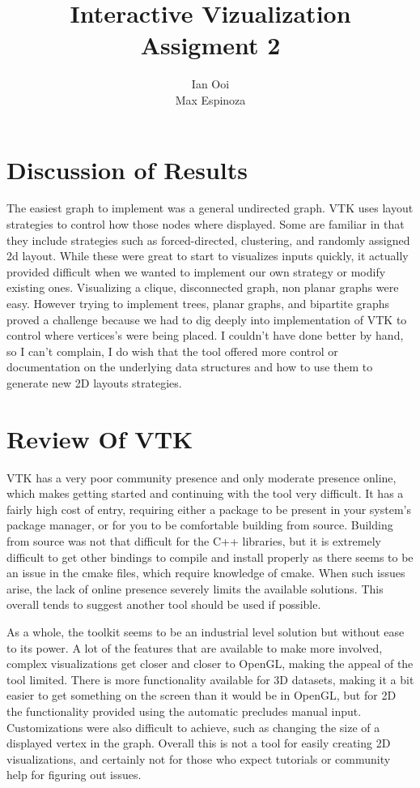 \documentclass[11pt]{article}
\title{\textbf{Interactive Vizualization}
\\
\normalsize{Assigment 2}
}
\author{Ian Ooi\\
		Max Espinoza}
\begin{document}
\maketitle


\section{Discussion of Results}

The easiest graph to implement was a general undirected graph. VTK uses layout strategies to control how those nodes where displayed. Some are familiar in that they include strategies such as forced-directed, clustering, and randomly assigned 2d layout. While these were great to start to visualizes inputs quickly, it actually provided difficult when we wanted to implement our own strategy or modify existing ones. Visualizing a clique, disconnected graph, non planar graphs were easy. However trying to implement trees, planar graphs, and bipartite graphs proved a challenge because we had to dig deeply into implementation of VTK to control where vertices's were being placed. I couldn't have done better by hand, so I can't complain, I do wish that the tool offered more control or documentation on the underlying data structures and how to use them to generate new 2D layouts strategies.



\section{Review Of VTK}

    VTK has a very poor community presence and only moderate presence online, which makes getting started and continuing with the tool very difficult.  It has a fairly high cost of entry, requiring either a package to be present in your system's package manager, or for you to be comfortable building from source.  Building from source was not that difficult for the C++ libraries, but it is extremely difficult to get other bindings to compile and install properly as there seems to be an issue in the cmake files, which require knowledge of cmake.  When such issues arise, the lack of online presence severely limits the available solutions.  This overall tends to suggest another tool should be used if possible.

    As a whole, the toolkit seems to be an industrial level solution but without ease to its power.  A lot of the features that are available to make more involved, complex visualizations get closer and closer to OpenGL, making the appeal of the tool limited.  There is more functionality available for 3D datasets, making it a bit easier to get something on the screen than it would be in OpenGL, but for 2D the functionality provided using the automatic precludes manual input.  Customizations were also difficult to achieve, such as changing the size of a displayed vertex in the graph.  Overall this is not a tool for easily creating 2D visualizations, and certainly not for those who expect tutorials or community help for figuring out issues.
\end{document}
